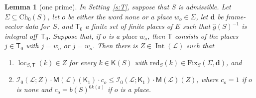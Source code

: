 \documentclass[11pt,a4paper]{article}
\newcommand{\m}[1]{\mbox{$#1$}}        %
\theoremstyle{plainx}
\newtheorem{lemma}[theorem]{Lemma}
\theoremstyle{uprightx}
\newcommand{\fs}{\mathfrak{s}}                      %
\newcommand{\sT}{\mathsf{T}}                        %
\newcommand{\cL}{\mathcal{L}}                       %
\newcommand{\kk}[1]{k(#1)}                          %
\newcommand{\bS}[1]{b(#1)}                          %
\newcommand{\ChS}[2]{\mathrm{Ch}_{#2}(#1)}          %
\newcommand{\KS}[1]{\mathsf{K}(#1)}                          %
\newcommand{\redS}[1]{\mathrm{red}_{#1}}            %
\newcommand{\gid}[1]{\hat{g}(#1)}                   %
\newcommand{\fixset}[3]{\mathrm{Fix}_{#1}(#2,#3)}   %
\newcommand{\IntG}[1]{\operatorname{Int}(#1)}       %
\newcommand{\fzf}[2]{\mathcal{I}_{0}(#1;#2)}        %
\newcommand{\loc}[2]{\operatorname{loc}_{#1,#2}}    %
\newcommand{\gM}[1]{\mathsf{M}(#1)}                 %
\begin{document}
\begin{lemma}[one prime]\label{l:oneprime}
In Setting~\ref{s:T}, suppose that $S$ is admissible. Let \m{\Sigma\subseteq\ChS{S}{0}}, let $o$ be either the
word \emph{none} or a place \m{w_o\in\Sigma}, let $\mathbf d$ be frame-vector data for~$S$, and $\sT_0$ a finite
set of finite places of $E$ such that \m{\gid{S}^{-1}} is integral off~$\sT_0$. Suppose that, if $o$ is a place
$w_o$, then $\sT$ consists of the places \m{j\in\sT_0} with \m{j=w_o} or \m{\bar j=w_o}. Then there is
\m{Z\in\IntG{\cL}} such that
\begin{enumerate}[label=\textup{(\roman*)},leftmargin=2.3em,itemsep=1pt]
\item \m{\loc{S}{\sT}(k)\in Z} for every \m{k\in\KS{S}} with \m{\redS{S}(k)\in\fixset{S}{\Sigma}{\mathbf d}}, and
\item \m{\fzf{\cL}{Z}\cdot\gM{\cL}(\mathsf{K}_1)\cdot c_o\le\fzf{\cL}{\mathsf{K}_1}\cdot\gM{\cL}(Z)}, where \m{c_o=1} if $o$ is
\emph{none} and \m{c_o=\bS{S}^{6\kk{\fs}}} if $o$ is a place.
\end{enumerate}
\end{lemma}
\end{document}
